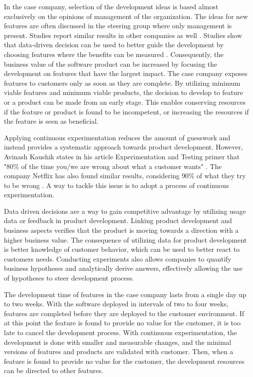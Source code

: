 \documentclass[english]{tktltiki2}
\theoremstyle{definition}
\theoremstyle{remark}
\begin{document}
In the case company, selection of the development ideas is based almost exclusively on the opinions of management of the organization. The ideas for new features are often discussed in the steering group where only management is present. Studies report similar results in other companies as well \cite{kohavi2007practical}. Studies show that data-driven decision can be used to better guide the development by choosing features where the benefits can be measured \cite{kohavi2007practical, moran2007wrong, kaushik}. Consequently, the business value of the software product can be increased by focusing the development on features that have the largest impact. The case company exposes features to customers only as soon as they are complete. By utilizing minimum viable features and minimum viable products, the decision to develop to feature or a product can be made from an early stage. This enables conserving resources if the feature or product is found to be incompetent, or increasing the resources if the feature is seen as beneficial. 

Applying continuous experimentation reduces the amount of guesswork and instead provides a systematic approach towards product development. However, Avinash Kaushik states in his article Experimentation and Testing primer that "80\% of the time you/we are wrong about what a customer wants" \cite{kaushik}. The company Netflix has also found similar results, considering 90\% of what they try to be wrong \cite{moran2007wrong}. A way to tackle this issue is to adopt a process of continuous experimentation.

Data driven decisions are a way to gain competitive advantage by utilizing usage data or feedback in product development. Linking product development and business aspects verifies that the product is moving towards a direction with a higher business value. The consequence of utilizing data for product development is better knowledge of customer behavior, which can be used to better react to customers needs. Conducting experiments also allows companies to quantify business hypotheses and analytically derive answers, effectively allowing the use of hypotheses to steer development process.

The development time of features in the case company lasts from a single day up to two weeks. With the software deployed in intervals of two to four weeks, features are completed before they are deployed to the customer environment. If at this point the feature is found to provide no value for the customer, it is too late to cancel the development process. With continuous experimentation, the development is done with smaller and measurable changes, and the minimal versions of features and products are validated with customer. Then, when a feature is found to provide no value for the customer, the development resources can be directed to other features.
\end{document}
